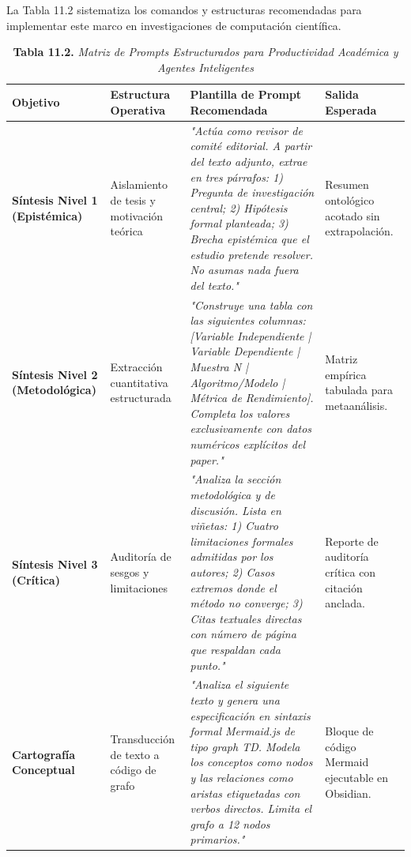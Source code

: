 La Tabla 11.2 sistematiza los comandos y estructuras recomendadas para implementar este marco en investigaciones de computación científica.

\begin{table}[tbp]
\centering
\footnotesize
\begin{tcolorbox}[colback=white, colframe=unmsm_gold, arc=3pt, boxrule=0.8pt, top=0.2cm, bottom=0.2cm, left=0.3cm, right=0.3cm]
\caption*{\textbf{Tabla 11.2.} \textit{Matriz de Prompts Estructurados para Productividad Académica y Agentes Inteligentes}}
\vspace{-0.2cm}
\begin{tabularx}{\textwidth}{>{\raggedright\arraybackslash\bfseries}p{2.3cm} >{\raggedright\arraybackslash}p{3.2cm} >{\raggedright\arraybackslash}X >{\raggedright\arraybackslash}p{2.8cm}}
\toprule
Objetivo & Estructura Operativa & Plantilla de Prompt Recomendada & Salida Esperada \\
\midrule
Síntesis Nivel 1 (Epistémica) & Aislamiento de tesis y motivación teórica & \textit{"Actúa como revisor de comité editorial. A partir del texto adjunto, extrae en tres párrafos: 1) Pregunta de investigación central; 2) Hipótesis formal planteada; 3) Brecha epistémica que el estudio pretende resolver. No asumas nada fuera del texto."} & Resumen ontológico acotado sin extrapolación. \\
\addlinespace
Síntesis Nivel 2 (Metodológica) & Extracción cuantitativa estructurada & \textit{"Construye una tabla con las siguientes columnas: [Variable Independiente | Variable Dependiente | Muestra N | Algoritmo/Modelo | Métrica de Rendimiento]. Completa los valores exclusivamente con datos numéricos explícitos del paper."} & Matriz empírica tabulada para metaanálisis. \\
\addlinespace
Síntesis Nivel 3 (Crítica) & Auditoría de sesgos y limitaciones & \textit{"Analiza la sección metodológica y de discusión. Lista en viñetas: 1) Cuatro limitaciones formales admitidas por los autores; 2) Casos extremos donde el método no converge; 3) Citas textuales directas con número de página que respaldan cada punto."} & Reporte de auditoría crítica con citación anclada. \\
\addlinespace
Cartografía Conceptual & Transducción de texto a código de grafo & \textit{"Analiza el siguiente texto y genera una especificación en sintaxis formal Mermaid.js de tipo graph TD. Modela los conceptos como nodos y las relaciones como aristas etiquetadas con verbos directos. Limita el grafo a 12 nodos primarios."} & Bloque de código Mermaid ejecutable en Obsidian. \\

\end{tabularx}
\end{tcolorbox}
\end{table}
